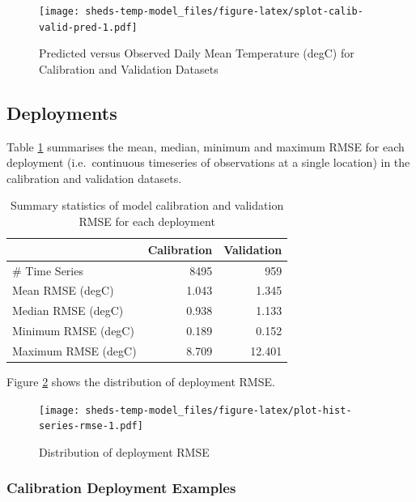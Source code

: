 \documentclass[]{book}
\begin{document}
\begin{figure}
\centering
\texttt{[image: sheds-temp-model\_files/figure-latex/splot-calib-valid-pred-1.pdf]}
\caption{\label{fig:splot-calib-valid-pred}Predicted versus Observed Daily Mean Temperature (degC) for Calibration and Validation Datasets}
\end{figure}

\hypertarget{deployments}{%
\subsection{Deployments}\label{deployments}}

Table \ref{tab:table-gof-series} summarises the mean, median, minimum and maximum RMSE for each deployment (i.e.~continuous timeseries of observations at a single location) in the calibration and validation datasets.

\begin{table}

\caption{\label{tab:table-gof-series}Summary statistics of model calibration and validation RMSE for each deployment}
\centering
\begin{tabular}[t]{l|r|r}
\hline
 & Calibration & Validation\\
\hline
\# Time Series & 8495 & 959\\
\hline
Mean RMSE (degC) & 1.043 & 1.345\\
\hline
Median RMSE (degC) & 0.938 & 1.133\\
\hline
Minimum RMSE (degC) & 0.189 & 0.152\\
\hline
Maximum RMSE (degC) & 8.709 & 12.401\\
\hline
\end{tabular}
\end{table}

Figure \ref{fig:plot-hist-series-rmse} shows the distribution of deployment RMSE.

\begin{figure}
\centering
\texttt{[image: sheds-temp-model\_files/figure-latex/plot-hist-series-rmse-1.pdf]}
\caption{\label{fig:plot-hist-series-rmse}Distribution of deployment RMSE}
\end{figure}

\hypertarget{calibration-deployment-examples}{%
\subsubsection{Calibration Deployment Examples}\label{calibration-deployment-examples}}
\end{document}
